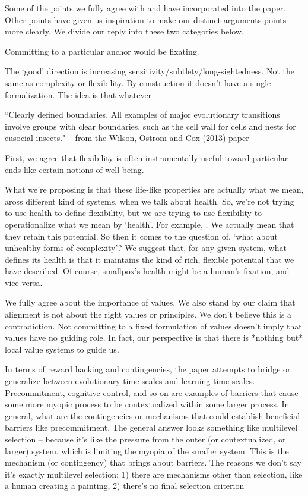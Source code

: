 \documentclass[fontsize=11.5pt]{scrartcl}
\newcounter{point}
\begin{document}
Some of the points we fully agree with and have incorporated into the paper. Other points have given us inspiration to make our distinct arguments points more clearly. We divide our reply into these two categories below.


Committing to a particular anchor would be fixating. 

The `good' direction is increasing sensitivity/subtlety/long-sightedness. Not the same as complexity or flexibility. By construction it doesn't have a single formalization. The idea is that whatever 

``Clearly defined boundaries. All examples of major evolutionary transitions involve groups with clear boundaries, such as the cell wall for cells and nests for eusocial insects." -- from the Wilson, Ostrom and Cox (2013) paper


First, we agree that flexibility is often instrumentally useful toward particular ends like certain notions of well-being. 

What we're proposing is that these life-like properties are actually what we mean, aross different kind of systems, when we talk about health. So, we're not trying to use health to define flexibility, but we are trying to use flexibility to operationalize what we mean by `health'. For example, . We actually mean that they retain this potential. So then it comes to the question of, `what about unhealthy forms of complexity'? We suggest that, for any given system, what defines its health is that it maintains the kind of rich, flexible potential that we have described. Of course, smallpox's health might be a human's fixation, and vice versa. 


We fully agree about the importance of values. We also stand by our claim that alignment is not about the right values or principles. We don't believe this is a contradiction. Not committing to a fixed formulation of values doesn't imply that values have no guiding role. In fact, our perspective is that there is *nothing but* local value systems to guide us.

In terms of reward hacking and contingencies, the paper attempts to bridge or generalize between evolutionary time scales and learning time scales. Precommitment, cognitive control, and so on are examples of barriers that cause some more myopic process to be contextualized within some larger process. In general, what are the contingencies or mechanisms that could establish beneficial barriers like precommitment. The general answer looks something like multilevel selection -- because it's like the pressure from the outer (or contextualized, or larger) system, which is limiting the myopia of the smaller system. This is the mechanism (or contingency) that brings about barriers. The reasons we don't say it's exactly multilevel selection: 1) there are mechanisms other than selection, like a human creating a painting, 2) there's no final selection criterion
\end{document}
